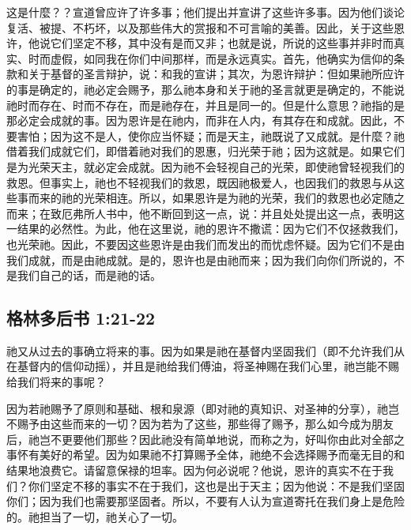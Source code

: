 这是什麼？？宣道曾应许了许多事；他们提出并宣讲了这些许多事。因为他们谈论复活、被提、不朽坏，以及那些伟大的赏报和不可言喻的美善。因此，关于这些恩许，他说它们坚定不移，其中没有是而又非；也就是说，所说的这些事并非时而真实、时而虚假，如同我在你们中间那样，而是永远真实。首先，他确实为信仰的条款和关于基督的圣言辩护，说：和我的宣讲；其次，为恩许辩护：但如果祂所应许的事是确定的，祂必定会赐予，那么祂本身和关于祂的圣言就更是确定的，不能说祂时而存在、时而不存在，而是祂存在，并且是同一的。但是什么意思？祂指的是那必定会成就的事。因为恩许是在祂内，而非在人内，有其存在和成就。因此，不要害怕；因为这不是人，使你应当怀疑；而是天主，祂既说了又成就。是什麼？祂借着我们成就它们，即借着祂对我们的恩惠，归光荣于祂；因为这就是。如果它们是为光荣天主，就必定会成就。因为祂不会轻视自己的光荣，即使祂曾轻视我们的救恩。但事实上，祂也不轻视我们的救恩，既因祂极爱人，也因我们的救恩与从这些事而来的祂的光荣相连。所以，如果恩许是为祂的光荣，我们的救恩也必定随之而来；在致厄弗所人书中，他不断回到这一点，说：并且处处提出这一点，表明这一结果的必然性。为此，他在这里说，祂的恩许不撒谎：因为它们不仅拯救我们，也光荣祂。因此，不要因这些恩许是由我们而发出的而忧虑怀疑。因为它们不是由我们成就，而是由祂成就。是的，恩许也是由祂而来；因为我们向你们所说的，不是我们自己的话，而是祂的话。\par


\subsection{格林多后书 1:21-22}

\par

祂又从过去的事确立将来的事。因为如果是祂在基督内坚固我们（即不允许我们从在基督内的信仰动摇），并且是祂给我们傅油，将圣神赐在我们心里，祂岂能不赐给我们将来的事呢？\par

因为若祂赐予了原则和基础、根和泉源（即对祂的真知识、对圣神的分享），祂岂不赐予由这些而来的一切？因为若为了这些，那些得了赐予，那么如今成为朋友后，祂岂不更要他们那些？因此祂没有简单地说，而称之为，好叫你由此对全部之事怀有美好的希望。因为如果祂不打算赐予全体，祂绝不会选择赐予而毫无目的和结果地浪费它。请留意保禄的坦率。因为何必说呢？他说，恩许的真实不在于我们？你们坚定不移的事实不在于我们，这也是出于天主；因为他说：不是我们坚固你们；因为我们也需要那坚固者。所以，不要有人认为宣道寄托在我们身上是危险的。祂担当了一切，祂关心了一切。\par

